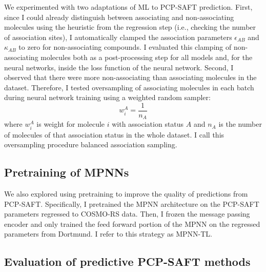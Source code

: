 We experimented with two adaptations of ML to PCP-SAFT prediction. First, since I could already distinguish between associating and non-associating molecules using the heuristic from the regression step (i.e., checking the number of association sites), I automatically clamped the association parameters $\epsilon_{AB}$ and $\kappa_{AB}$ to zero for non-associating compounds. I evaluated this clamping of non-associating molecules both as a post-processing step for all models and, for the neural networks, inside the loss function of the neural network. Second, I observed that there were more non-associating than associating molecules in the dataset. Therefore, I tested oversampling of associating molecules in each batch during neural network training using a weighted random sampler:
\begin{equation}
    w_i^{A} = \frac{1}{n_A}
\end{equation}
where $w_i^{A}$ is weight for molecule $i$ with association status $A$ and $n_A$ is the number of molecules of that association status in the whole dataset. I call this oversampling procedure balanced association sampling.

\subsection{Pretraining of MPNNs}

We also explored using pretraining to improve the quality of predictions from PCP-SAFT. Specifically, I pretrained the MPNN architecture on the PCP-SAFT parameters regressed to COSMO-RS data. Then, I frozen the message passing encoder and only trained the feed forward portion of the MPNN on the regressed parameters from Dortmund. I refer to this strategy as MPNN-TL.

\subsection{Evaluation of predictive PCP-SAFT methods}

